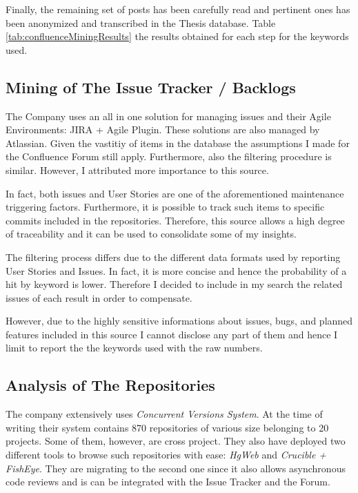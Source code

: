 Finally, the remaining set of posts has been carefully read and pertinent ones has been anonymized and transcribed in the Thesis database. Table \ref{tab:confluenceMiningResults} the results obtained for each step for the keywords used.



\subsection{Mining of The Issue Tracker / Backlogs}

The Company uses an all in one solution for managing issues and their Agile Environments: JIRA + Agile Plugin. These solutions are also managed by Atlassian. Given the vastitiy of items in the database the assumptions I made for the Confluence Forum still apply. Furthermore, also the filtering procedure is similar. However, I attributed more importance to this source.

In fact, both issues and User Stories are one of the aforementioned maintenance triggering factors. Furthermore, it is possible to track such items to specific commits included in the repositories. Therefore, this source allows a high degree of traceability and it can be used to consolidate some of my insights.

The filtering process differs due to the different data formats used by reporting User Stories and Issues. In fact, it is more concise and hence the probability of a hit by keyword is lower. Therefore I decided to include in my search the related issues of each result in order to compensate.

However, due to the highly sensitive informations about issues, bugs, and planned features included in this source I cannot disclose any part of them and hence I limit to report the the keywords used with the raw numbers.






\subsection{Analysis of The Repositories} \label{analysis_of_the_repos}
The company extensively uses \textit{Concurrent Versions System}. At the time of writing their system contains 870 repositories of various size belonging to 20 projects. Some of them, however, are cross project. They also have deployed two different tools to browse such repositories with ease: \textit{HgWeb} and \textit{Crucible + FishEye}. They are migrating to the second one since it also allows asynchronous code reviews and is can be integrated with the Issue Tracker and the Forum.


